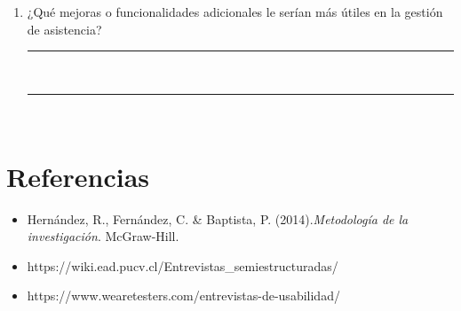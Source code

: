 \documentclass[12pt, a4paper]{article}
\begin{document}
\begin{enumerate}[label=\textbf{B\arabic*}.]
                                                                                                                                                        \item ¿Qué mejoras o funcionalidades adicionales le serían más útiles en la gestión de asistencia?\\
                                                                                                                                                            \rule{\textwidth}{0.3pt} \\[0.5cm]
                                                                                                                                                            \rule{\textwidth}{0.3pt} \\[0.5cm]
                                                                                                                                                            \end{enumerate}


                                                                                                                                                            \section*{Referencias}
                                                                                                                                                            \begin{itemize}
                                                                                                                                                            \item Hernández, R., Fernández, C. \& Baptista, P. (2014).\textit{Metodología de la investigación}. McGraw-Hill. 
                                                                                                                                                            \item https://wiki.ead.pucv.cl/Entrevistas\_semiestructuradas/
                                                                                                                                                            \item https://www.wearetesters.com/entrevistas-de-usabilidad/ 

                                                                                                                                                            \end{itemize}
                                                                                                                                                            
\end{document}

